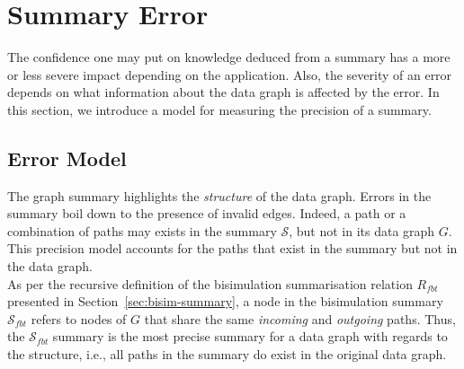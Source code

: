 \section{Summary Error}

The confidence one may put on knowledge deduced from a summary has a more or less severe impact depending on the application. Also, the severity of an error depends on what information about the data graph is affected by the error. In this section, we introduce a model for measuring the precision of a summary.

\subsection{Error Model}

The graph summary highlights the \emph{structure} of the data graph. Errors in the summary boil down to the presence of invalid edges. Indeed, a path or a combination of paths may exists in the summary $\mathcal{S}$, but not in its data graph $G$. This precision model accounts for the paths that exist in the summary but not in the data graph.\\

%

As per the recursive definition of the bisimulation summarisation relation $R_{fbt}$ presented in Section~\ref{sec:bisim-summary}, a node in the bisimulation summary $\mathcal{S}_{fbt}$ refers to nodes of $G$ that share the same \emph{incoming} and \emph{outgoing} paths. Thus, the $\mathcal{S}_{fbt}$ summary is the most precise summary for a data graph with regards to the structure, i.e., all paths in the summary do exist in the original data graph.

